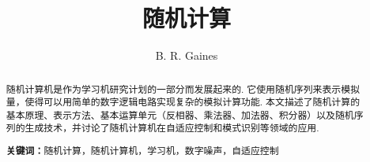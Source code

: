 \documentclass{math-article}
\title{随机计算}
\author{B. R. Gaines}
\begin{document}
\maketitle

\begin{abstract}
    随机计算机是作为学习机研究计划的一部分而发展起来的. 它使用随机序列来表示模拟量，使得可以用简单的数字逻辑电路实现复杂的模拟计算功能. 本文描述了随机计算的基本原理、表示方法、基本运算单元（反相器、乘法器、加法器、积分器）以及随机序列的生成技术，并讨论了随机计算机在自适应控制和模式识别等领域的应用.

    \noindent\textbf{关键词：}\songti{}随机计算，随机计算机，学习机，数字噪声，自适应控制
\end{abstract}









\end{document}
